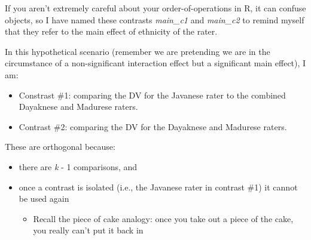 \documentclass[
  11pt,
]{book}
\newenvironment{Shaded}{\begin{snugshade}}{\end{snugshade}}
\newcommand{\CommentTok}[1]{\textcolor[rgb]{0.56,0.35,0.01}{\textit{#1}}}
\newcommand{\DecValTok}[1]{\textcolor[rgb]{0.00,0.00,0.81}{#1}}
\newcommand{\FunctionTok}[1]{\textcolor[rgb]{0.00,0.00,0.00}{#1}}
\newcommand{\NormalTok}[1]{#1}
\newcommand{\OtherTok}[1]{\textcolor[rgb]{0.56,0.35,0.01}{#1}}
\newcommand{\SpecialCharTok}[1]{\textcolor[rgb]{0.00,0.00,0.00}{#1}}
\providecommand{\tightlist}{%
  \setlength{\itemsep}{0pt}\setlength{\parskip}{0pt}}
\begin{document}
If you aren't extremely careful about your order-of-operations in R, it can confuse objects, so I have named these contrasts \emph{main\_c1} and \emph{main\_c2} to remind myself that they refer to the main effect of ethnicity of the rater.

In this hypothetical scenario (remember we are pretending we are in the circumstance of a non-significant interaction effect but a significant main effect), I am:

\begin{itemize}
\tightlist
\item
  Constrast \#1: comparing the DV for the Javanese rater to the combined Dayaknese and Madurese raters.
\item
  Contrast \#2: comparing the DV for the Dayaknese and Madurese raters.
\end{itemize}

These are orthogonal because:

\begin{itemize}
\tightlist
\item
  there are \emph{k} - 1 comparisons, and
\item
  once a contrast is isolated (i.e., the Javanese rater in contrast \#1) it cannot be used again

  \begin{itemize}
  \tightlist
  \item
    Recall the piece of cake analogy: once you take out a piece of the cake, you really can't put it back in
  \end{itemize}
\end{itemize}

\begin{Shaded}
\end{Shaded}
\end{document}
